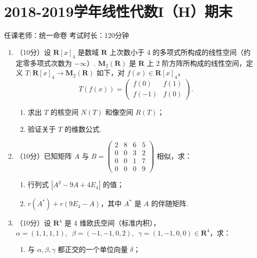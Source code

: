 \section{2018-2019学年线性代数I（H）期末}

\begin{center}
    任课老师：统一命卷\hspace{4em} 考试时长：120分钟
\end{center}

\begin{enumerate}
    \item （10分）设 $\mathbf{R}[x]_4$ 是数域 $\mathbf{R}$ 上次数小于 4 的多项式所构成的线性空间（约定零多项式次数为 $-\infty$）. $\mathbf{M}_2(\mathbf{R})$ 是 $\mathbf{R}$ 上 2 阶方阵所构成的线性空间，定义 $T \colon \mathbf{R}[x]_4 \to \mathbf{M}_2(\mathbf{R})$ 如下，对 $f(x) \in \mathbf{R}[x]_4$，
    \[T(f(x))=\begin{pmatrix}f(0) & f(1) \\ f(-1) & f(0)\end{pmatrix}.\]
    \begin{enumerate}
        \item 求出 $T$ 的核空间 $N(T)$ 和像空间 $R(T)$；

        \item 验证关于 $T$ 的维数公式.
    \end{enumerate}

    \item （10分）已知矩阵 $A$ 与 $B=\begin{pmatrix}2 & 8 & 6 & 5 \\ 0 & 0 & 3 & 2 \\ 0 & 0 & 1 & 7 \\ 0 & 0 & 0 & 9\end{pmatrix}$ 相似，求：
    \begin{enumerate}
        \item 行列式 $|A^2-9A+4E_4|$ 的值；

        \item $r(A^*)+r(9E_4-A)$，其中 $A^*$ 是 $A$ 的伴随矩阵.
    \end{enumerate}

    \item （10分）设 $\mathbf{R}^4$ 是 4 维欧氏空间（标准内积），$\alpha=(1,1,1,1),\enspace\allowbreak\beta=(-1,-1,0,2),\enspace\allowbreak\gamma=(1,-1,0,0) \in \mathbf{R}^4$，求：
    \begin{enumerate}
        \item 与 $\alpha,\beta,\gamma$ 都正交的一个单位向量 $\delta$；


\end{enumerate}
\end{enumerate}
